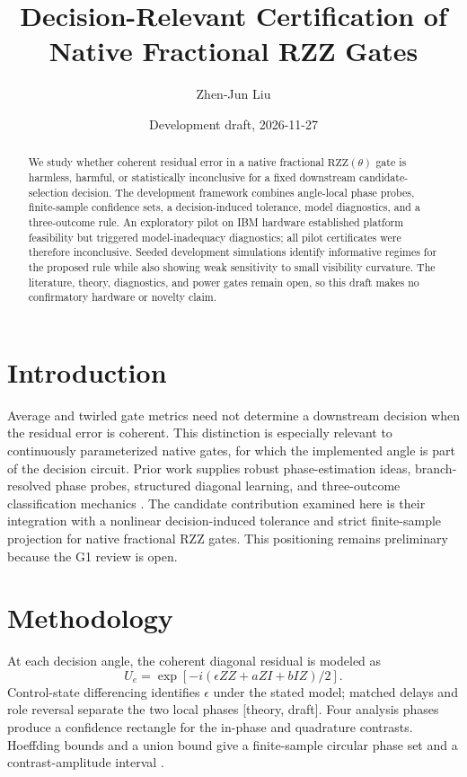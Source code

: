 \documentclass[10pt,twocolumn]{article}
\title{Decision-Relevant Certification of Native Fractional RZZ Gates}
\author{Zhen-Jun Liu}
\date{Development draft, 2026-11-27}
\newcommand{\RZZ}{\mathrm{RZZ}}
\newcommand{\evidence}[1]{\textnormal{[#1]}}
\begin{document}
\maketitle

\begin{abstract}
We study whether coherent residual error in a native fractional
$\RZZ(\theta)$ gate is harmless, harmful, or statistically inconclusive for a
fixed downstream candidate-selection decision.  The development framework
combines angle-local phase probes, finite-sample confidence sets, a
decision-induced tolerance, model diagnostics, and a three-outcome rule.  An
exploratory pilot on IBM hardware established platform feasibility but
triggered model-inadequacy diagnostics; all pilot certificates were therefore
inconclusive.  Seeded development simulations identify informative regimes
for the proposed rule while also showing weak sensitivity to small visibility
curvature.  The literature, theory, diagnostics, and power gates remain open,
so this draft makes no confirmatory hardware or novelty claim.
\end{abstract}

\section{Introduction}
Average and twirled gate metrics need not determine a downstream decision when
the residual error is coherent.  This distinction is especially relevant to
continuously parameterized native gates, for which the implemented angle is
part of the decision circuit.  Prior work supplies robust phase-estimation
ideas, branch-resolved phase probes, structured diagonal learning, and
three-outcome classification mechanics
\cite{RUDINGER2025,CHAI2026,DENG2026}.  The candidate contribution examined
here is their integration with a nonlinear decision-induced tolerance and
strict finite-sample projection for native fractional $\RZZ$ gates.  This
positioning remains preliminary because the G1 review is open.

\section{Methodology}
At each decision angle, the coherent diagonal residual is modeled as
\begin{equation}
 U_e=\exp[-i(\epsilon ZZ+aZI+bIZ)/2].
\end{equation}
Control-state differencing identifies $\epsilon$ under the stated model;
matched delays and role reversal separate the two local phases
\evidence{theory, draft}.  Four analysis phases produce a confidence rectangle
for the in-phase and quadrature contrasts.  Hoeffding bounds and a union bound
give a finite-sample circular phase set and a contrast-amplitude interval
\cite{HOEFFDING1963}.
\end{document}
